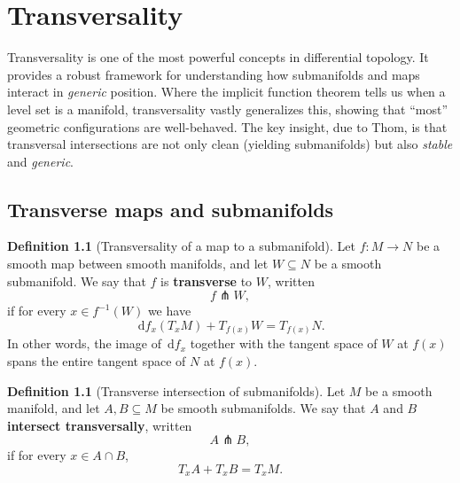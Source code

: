 \documentclass[12pt,a4paper,openany]{book}
\theoremstyle{definition}
\newtheorem{definition}[theorem]{Definition}
\theoremstyle{remark}
\newcommand{\dd}{\,\mathrm{d}}
\begin{document}


\chapter{Transversality}\label{ch:transversality}
\minitoc\vspace{1cm}

Transversality is one of the most powerful concepts in differential topology.
It provides a robust framework for understanding how submanifolds and maps
interact in \emph{generic} position. Where the implicit function theorem
tells us when a level set is a manifold, transversality vastly generalizes
this, showing that ``most'' geometric configurations are well-behaved.
The key insight, due to Thom, is that transversal intersections are not
only clean (yielding submanifolds) but also \emph{stable} and \emph{generic}.

\section{Transverse maps and submanifolds}\label{sec:transverse-maps}

\begin{definition}[Transversality of a map to a submanifold]\label{def:transverse-map}
Let $f \colon M \to N$ be a smooth map between smooth manifolds, and let
$W \subseteq N$ be a smooth submanifold. We say that $f$ is
\textbf{transverse} to $W$, written
\[
  f \pitchfork W,
\]
if for every $x \in f^{-1}(W)$ we have
\[
  \dd f_x(T_x M) + T_{f(x)} W = T_{f(x)} N.
\]
In other words, the image of $\dd f_x$ together with the tangent space
of $W$ at $f(x)$ spans the entire tangent space of $N$ at $f(x)$.
\end{definition}

\begin{definition}[Transverse intersection of submanifolds]\label{def:transverse-submanifolds}
Let $M$ be a smooth manifold, and let $A, B \subseteq M$ be smooth
submanifolds. We say that $A$ and $B$ \textbf{intersect transversally},
written
\[
  A \pitchfork B,
\]
if for every $x \in A \cap B$,
\[
  T_x A + T_x B = T_x M.
\]
\end{definition}
\end{document}

